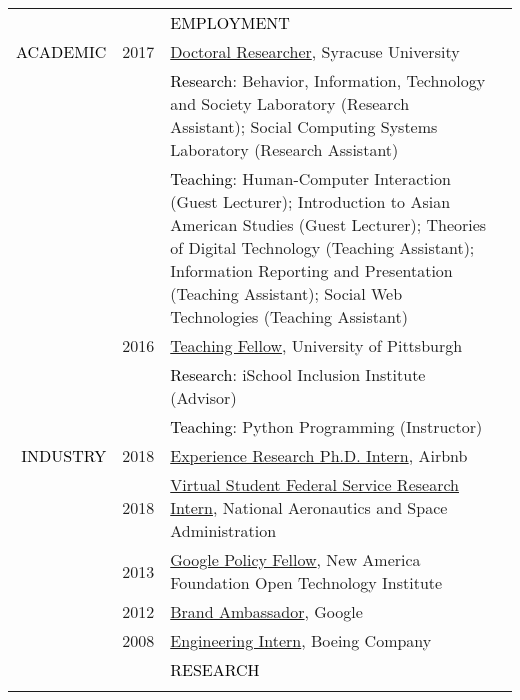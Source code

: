 \documentclass[12pt]{article}
\begin{document}
{{\begin{longtable}{Rp{1.0in}p{0.25in}p{4.75in}}
&&\par \Large \textcolor{black}{\uppercase{Employment}}\\ \hhline{~~-} 

\textcolor{black}{\footnotesize{\uppercase{Academic}}} & \footnotesize{2017} & \href{http://bits.ischool.syr.edu/}{{Doctoral Researcher}}, Syracuse University \\ && \textcolor{black}{Research}: Behavior, Information, Technology and Society Laboratory (Research Assistant); Social Computing Systems Laboratory (Research Assistant) \\ && \textcolor{black}{Teaching}: Human-Computer Interaction (Guest Lecturer); Introduction to Asian American Studies (Guest Lecturer); Theories of Digital Technology (Teaching Assistant); Information Reporting and Presentation (Teaching Assistant); Social Web Technologies (Teaching Assistant) \\

& \footnotesize{2016} & \href{http://www.sis.pitt.edu/i3/phd-fellows/fellow-profiles.html}{{Teaching Fellow}}, University of Pittsburgh \\ &&\textcolor{black}{Research}: iSchool Inclusion Institute (Advisor) \\ &&\textcolor{black}{Teaching}: Python Programming (Instructor) \\

\textcolor{black}{\footnotesize{\uppercase{Industry}}} & \footnotesize{2018} & \href{https://www.airbnb.com/}{{Experience Research Ph.D. Intern}}, Airbnb \\

& \footnotesize{2018} & \href{https://vsfs.state.gov/about}{{Virtual Student Federal Service Research Intern}}, National Aeronautics and Space Administration \\

& \footnotesize{2013} & \href{https://www.google.com/policyfellowship/2013fellows.html}{{Google Policy Fellow}}, New America Foundation Open Technology Institute \\

& \footnotesize{2012} & \href{https://students.googleblog.com/2012/09/a-new-class-of-google-student.html}{{Brand Ambassador}}, Google \\

& \footnotesize{2008} & \href{http://www.engr.washington.edu/curr\_students/studentprogs/alva.html}{{Engineering Intern}}, Boeing Company \bigskip \\

&&\par \Large \textcolor{black}{\uppercase{Research}} \\ \hhline{~~-}


\end{longtable}}}
\end{document}
